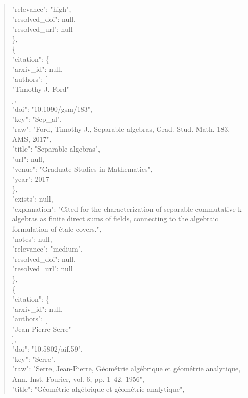 \documentclass[11pt]{article}
\begin{document}
\begin{quote}
      "relevance": "high",\\
      "resolved\_doi": null,\\
      "resolved\_url": null\\
    \},\\
    \{\\
      "citation": \{\\
        "arxiv\_id": null,\\
        "authors": [\\
          "Timothy J. Ford"\\
        ],\\
        "doi": "10.1090/gsm/183",\\
        "key": "Sep\_al",\\
        "raw": "Ford, Timothy J., Separable algebras, Grad. Stud. Math. 183, AMS, 2017",\\
        "title": "Separable algebras",\\
        "url": null,\\
        "venue": "Graduate Studies in Mathematics",\\
        "year": 2017\\
      \},\\
      "exists": null,\\
      "explanation": "Cited for the characterization of separable commutative k-algebras as finite direct sums of fields, connecting to the algebraic formulation of étale covers.",\\
      "notes": null,\\
      "relevance": "medium",\\
      "resolved\_doi": null,\\
      "resolved\_url": null\\
    \},\\
    \{\\
      "citation": \{\\
        "arxiv\_id": null,\\
        "authors": [\\
          "Jean-Pierre Serre"\\
        ],\\
        "doi": "10.5802/aif.59",\\
        "key": "Serre",\\
        "raw": "Serre, Jean-Pierre, Géométrie algébrique et géométrie analytique, Ann. Inst. Fourier, vol. 6, pp. 1--42, 1956",\\
        "title": "Géométrie algébrique et géométrie analytique",\\

\end{quote}
\end{document}
